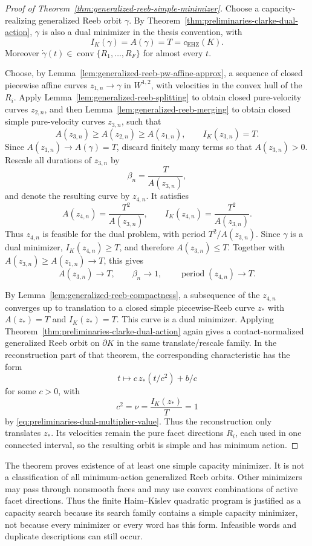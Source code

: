 \begin{proof}[Proof of Theorem~\ref{thm:generalized-reeb-simple-minimizer}]
Choose a capacity-realizing generalized Reeb orbit \(\gamma\). By
Theorem~\ref{thm:preliminaries-clarke-dual-action}, \(\gamma\) is also a dual
minimizer in the thesis convention, with
\[
  I_K(\gamma)=A(\gamma)=T=c_{\mathrm{EHZ}}(K).
\]
Moreover \(\dot\gamma(t)\in\operatorname{conv}\{R_1,\ldots,R_F\}\) for almost
every \(t\).

Choose, by Lemma~\ref{lem:generalized-reeb-pw-affine-approx}, a sequence of
closed piecewise affine curves \(z_{1,n}\to\gamma\) in \(W^{1,2}\), with
velocities in the convex hull of the \(R_i\). Apply
Lemma~\ref{lem:generalized-reeb-splitting} to obtain closed pure-velocity
curves \(z_{2,n}\), and then Lemma~\ref{lem:generalized-reeb-merging} to obtain
closed simple pure-velocity curves \(z_{3,n}\), such that
\[
  A(z_{3,n})\geq A(z_{2,n})\geq A(z_{1,n}),
  \qquad
  I_K(z_{3,n})=T.
\]
Since \(A(z_{1,n})\to A(\gamma)=T\), discard finitely many terms so that
\(A(z_{3,n})>0\). Rescale all durations of \(z_{3,n}\) by
\[
  \beta_n=\frac{T}{A(z_{3,n})},
\]
and denote the resulting curve by \(z_{4,n}\). It satisfies
\[
  A(z_{4,n})=\frac{T^2}{A(z_{3,n})},
  \qquad
  I_K(z_{4,n})=\frac{T^2}{A(z_{3,n})}.
\]
Thus \(z_{4,n}\) is feasible for the dual problem, with period
\(T^2/A(z_{3,n})\). Since \(\gamma\) is a dual minimizer,
\(I_K(z_{4,n})\geq T\), and therefore \(A(z_{3,n})\leq T\). Together with
\(A(z_{3,n})\geq A(z_{1,n})\to T\), this gives
\[
  A(z_{3,n})\to T,
  \qquad \beta_n\to1,
  \qquad \operatorname{period}(z_{4,n})\to T.
\]

By Lemma~\ref{lem:generalized-reeb-compactness}, a subsequence of the \(z_{4,n}\)
converges up to translation to a closed simple piecewise-Reeb curve \(z_*\)
with \(A(z_*)=T\) and \(I_K(z_*)=T\). This curve is a dual minimizer. Applying
Theorem~\ref{thm:preliminaries-clarke-dual-action} again gives a
contact-normalized generalized Reeb orbit on \(\partial K\) in the same
translate/rescale family. In the reconstruction part of that theorem, the
corresponding characteristic has the form
\[
  t\longmapsto c\,z_*(t/c^2)+b/c
\]
for some \(c>0\), with
\[
  c^2=\nu=\frac{I_K(z_*)}{T}=1
\]
by \eqref{eq:preliminaries-dual-multiplier-value}. Thus the reconstruction
only translates \(z_*\). Its velocities
remain the pure facet directions \(R_i\), each used in one connected interval,
so the resulting orbit is simple and has minimum action.
\end{proof}

The theorem proves existence of at least one simple capacity minimizer. It is
not a classification of all minimum-action generalized Reeb orbits. Other
minimizers may pass through nonsmooth faces and may use convex combinations of
active facet directions. Thus the finite Haim--Kislev quadratic program is
justified as a capacity search because its search family contains a simple
capacity minimizer, not because every minimizer or every word has this form.
Infeasible words and duplicate descriptions can still occur.
